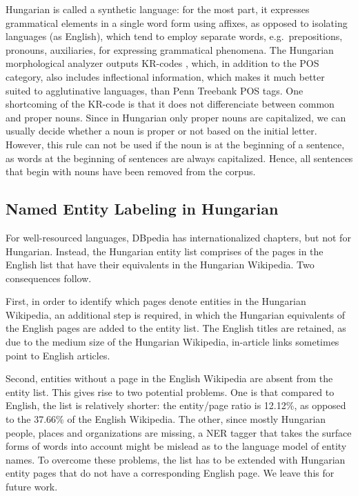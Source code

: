 \documentclass[11pt]{article}
\begin{document}
Hungarian is called a synthetic language: for the most part, it expresses grammatical elements in a single word form using affixes, as opposed to isolating languages (as English), which tend to employ separate words, e.g.~prepositions, pronouns, auxiliaries, for expressing grammatical phenomena. The Hungarian morphological analyzer outputs KR-codes \cite{Kornai:04}, which, in addition to the POS category, also includes inflectional information, which makes it much better suited to agglutinative languages, than Penn Treebank POS tags. One shortcoming of the KR-code is that it does not differenciate between common and proper nouns. Since in Hungarian only proper nouns are capitalized, we can usually decide whether a noun is proper or not based on the initial letter. However, this rule can not be used if the noun is at the beginning of a sentence, as words at the beginning of sentences are always capitalized. Hence, all sentences that begin with nouns have been removed from the corpus.

\subsection{Named Entity Labeling in Hungarian}

For well-resourced languages, DBpedia has internationalized chapters, 
but not for Hungarian. Instead, the Hungarian entity list comprises of the pages in the English list that have their equivalents in the Hungarian Wikipedia. Two consequences follow.

First, in order to identify which pages denote entities in the Hungarian Wikipedia, an additional step is required, in which the Hungarian equivalents of the English pages are added to the entity list. The English titles are retained, as due to the medium size of the Hungarian Wikipedia, in-article links sometimes point to English articles.

Second, entities without a page in the English Wikipedia are absent from the entity list. This gives rise to two potential problems. One is that compared to English, the list is relatively shorter: the entity/page ratio is 12.12\%, as opposed to the 37.66\% of the English Wikipedia. The other, since mostly Hungarian people, places and organizations are missing, a NER tagger that takes the surface forms of words into account might be mislead as to the language model of entity names. To overcome these problems, the list has to be extended with Hungarian entity pages that do not have a corresponding English page. We leave this for future work.
\end{document}
